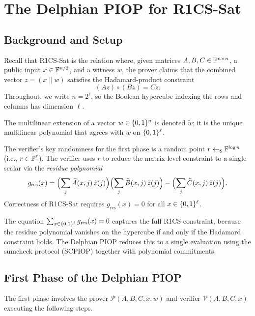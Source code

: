 \documentclass[11pt]{article}
\newcommand{\tildew}{\tilde{w}}
\newcommand{\tildeA}{\widetilde{A}}
\newcommand{\tildeB}{\widetilde{B}}
\newcommand{\tildeC}{\widetilde{C}}
\newcommand{\tildez}{\tilde{z}}
\begin{document}
\section{The Delphian PIOP for R1CS-Sat}

\subsection{Background and Setup}

Recall that R1CS-Sat is the relation where, given matrices $A, B, C \in \mathbb{F}^{n \times n}$, a
public input $x \in \mathbb{F}^{n/2}$, and a witness $w$, the prover claims that the combined vector
$z = (x \| w)$ satisfies the Hadamard-product constraint
\[
  (Az) \circ (Bz) = Cz.
\]
Throughout, we write $n = 2^\ell$, so the Boolean hypercube indexing the rows and columns
has dimension $\ell$.

The multilinear extension of a vector $w \in \{0,1\}^n$ is denoted $\tildew$; it is the
unique multilinear polynomial that agrees with $w$ on $\{0,1\}^\ell$.

\medskip
The verifier's key randomness for the first phase is a random point
$r \leftarrow_\$ \mathbb{F}^{\log n}$ (i.e., $r \in \mathbb{F}^\ell$).  The verifier uses $r$ to reduce
the matrix-level constraint to a single scalar via the \emph{residue polynomial}
\[
  g_{\mathrm{res}}(x)
  =
  \Bigl(\sum_{j} \tildeA(x,j)\,\tildez(j)\Bigr)
  \Bigl(\sum_{j} \tildeB(x,j)\,\tildez(j)\Bigr)
  -
  \Bigl(\sum_{j} \tildeC(x,j)\,\tildez(j)\Bigr).
\]
Correctness of R1CS-Sat requires $g_{\mathrm{res}}(x) = 0$ for all $x \in \{0,1\}^\ell$.

\begin{importantbox}
  The equation $\sum_{x \in \{0,1\}^\ell} g_{\mathrm{res}}(x) = 0$ captures the full R1CS
  constraint, because the residue polynomial vanishes on the hypercube if and only if the
  Hadamard constraint holds.  The Delphian PIOP reduces this to a single evaluation using the
  sumcheck protocol (SCPIOP) together with polynomial commitments.
\end{importantbox}

\subsection{First Phase of the Delphian PIOP}

The first phase involves the prover $\mathcal{P}(A,B,C,x,w)$ and verifier
$\mathcal{V}(A,B,C,x)$ executing the following steps.
\end{document}
